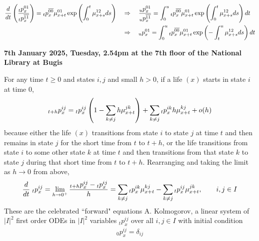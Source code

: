 \documentclass[hidelinks, 12pt]{article}
\theoremstyle{mydefstyle}
\theoremstyle{mythmstyle}
\begin{document}
\begin{align*}
\frac{d}{dt} \left( \frac{\hspace{0mm}_tp_x^{01}}{\hspace{0mm}_tp_x^{\overline{11}}} \right)
= \hspace{0mm}_tp_x^{\overline{00}} \mu_{x+t}^{01} \exp \left( \int_0^t \mu_{x+s}^{12} ds \right) 
\quad&\Rightarrow\quad
\frac{\hspace{0mm}_up_x^{01}}{\hspace{0mm}_up_x^{\overline{11}}} = \int_0^u \hspace{0mm}_tp_x^{\overline{00}} \mu_{x+t}^{01} \exp \left( \int_0^t \mu_{x+s}^{12} ds \right) dt \\
&\Rightarrow\quad \hspace{0mm}_up_x^{01}
= \int_0^u \hspace{0mm}_tp_x^{\overline{00}} \mu_{x+t}^{01} \exp \left( - \int_t^u \mu_{x+s}^{12} ds \right) dt
\end{align*}

\textbf{7th January 2025, Tuesday, 2.54pm at the 7th floor of the National Library at Bugis}

For any time $t \ge 0$ and states $i, j$ and small $h > 0$, if a life $(x)$ starts in state $i$ at time 0, 
\begin{gather*}
\hspace{0mm}_{t+h}p_x^{ij} 
= \hspace{0mm}_tp_x^{ij} \left( 1 - \sum_{k \ne j} h \mu_{x+t}^{jk} \right) 
+ \sum_{k \ne j} \hspace{0mm}_tp_x^{ik} h \mu_{x+t}^{kj} + o(h)
\end{gather*}
because either the life $(x)$ transitions from state $i$ to state $j$ at time $t$ and then remains in state $j$ for the short time from $t$ to $t+h$, or the life transitions from state $i$ to some other state $k$ at time $t$ and then transitions from that state $k$ to state $j$ during that short time from $t$ to $t+h$. Rearranging and taking the limit as $h \to 0$ from above,
\begin{gather*}
\frac{d}{dt} \hspace{1mm}_tp_x^{ij}
= \lim_{h \to 0^+} \frac{\hspace{0mm}_{t+h}p_x^{ij} - \hspace{0mm}_tp_x^{ij}}{h}
= \sum_{k \ne j} \hspace{0mm}_tp_x^{ik} \mu_{x+t}^{kj} - \sum_{k \ne j} \hspace{0mm}_tp_x^{ij} \mu_{x+t}^{jk}, \qquad i, j \in I
\end{gather*}
These are the celebrated ``forward" equations A. Kolmogorov, a linear system of $|I|^2$ first order ODEs in $|I|^2$ variables $_tp_x^{ij}$ over all $i, j \in I$ with initial condition
\begin{gather*}
_0p_x^{ij} = \delta_{ij}
\end{gather*}
\end{document}
